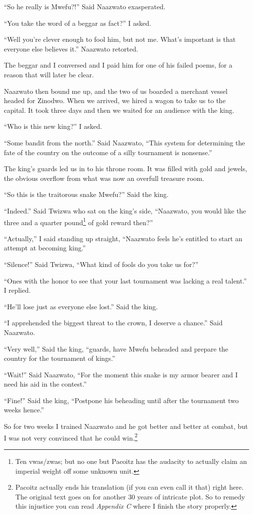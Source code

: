 ``So he really is Mwe\-fu?!'' Said Naa\-zwa\-to exasperated.

``You take the word of a beggar as fact?'' I asked.

``Well you're clever enough to fool him, but not me. What's important is that everyone else believes it.'' Naa\-zwa\-to retorted.

The beggar and I conversed and I paid him for one of his failed poems, for a reason that will later be clear.

Naa\-zwa\-to then bound me up, and the two of us boarded a merchant vessel headed for Zi\-no\-dwo.
When we arrived, we hired a wagon to take us to the capital. It took three days and then we waited for an audience with the king.

``Who is this new king?'' I asked.

``Some bandit from the north.'' Said Naa\-zwa\-to, ``This system for determining the fate of the country on the outcome of a silly tournament is nonsense.''

The king's guards led us in to his throne room. It was filled with gold and jewels, the obvious overflow from what was now an overfull treasure room.

``So this is the traitorous snake Mwe\-fu?'' Said the king.

``Indeed.'' Said Twi\-zwa who sat on the king's side, ``Naa\-zwa\-to, you would like the three and a quarter pound\footnote{Ten vwas/zwas; but no one but Pa\-co\-itz has the audacity to actually claim an imperial weight off some unknown unit.} of gold reward then?''

``Actually,'' I said standing up straight, ``Naa\-zwa\-to feels he's entitled to start an attempt at becoming king.''

``Silence!'' Said Twi\-zwa, ``What kind of fools do you take us for?''

``Ones with the honor to see that your last tournament was lacking a real talent.'' I replied.

``He'll lose just as everyone else lost.'' Said the king.

``I apprehended the biggest threat to the crown, I deserve a chance.'' Said Naa\-zwa\-to.

``Very well,'' Said the king, ``guards, have Mwe\-fu beheaded and prepare the country for the tournament of kings.''

``Wait!'' Said Naa\-zwa\-to, ``For the moment this snake is my armor bearer and I need his aid in the contest.''

``Fine!'' Said the king, ``Postpone his beheading until after the tournament two weeks hence.''

So for two weeks I trained Naa\-zwa\-to and he got better and better at combat, but I was not very convinced that he could win.\footnote{Pa\-co\-itz actually ends his translation (if you can even call it that) right here. The original text goes on for another 30 years of intricate plot. So to remedy this injustice you can read \emph{Appendix C} where I finish the story properly.}
